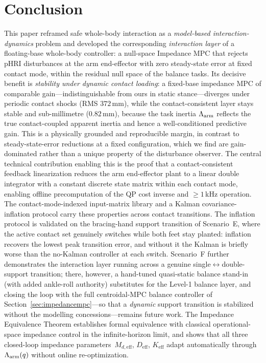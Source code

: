 \section{Conclusion}\label{sec:conclusion}

This paper reframed safe whole-body interaction as a \emph{model-based
interaction-dynamics} problem and developed the corresponding
\emph{interaction layer} of a floating-base whole-body controller: a
null-space Impedance MPC that rejects pHRI disturbances at the arm
end-effector with zero steady-state error at fixed contact mode, within the
residual null space of the balance tasks.
Its decisive benefit is \emph{stability under dynamic contact loading}: a
fixed-base impedance MPC of comparable gain---indistinguishable from ours in
static stance---diverges under periodic contact shocks (RMS $372$\,mm), while
the contact-consistent layer stays stable and sub-millimetre ($0.82$\,mm),
because the task inertia $\Lambda_{\text{arm}}$ reflects the true contact-coupled apparent
inertia and hence a well-conditioned predictive gain. This is a physically
grounded and reproducible margin, in contrast to steady-state-error reductions
at a fixed configuration, which we find are gain-dominated rather than a unique
property of the disturbance observer.
The central technical contribution enabling this is the proof that a
contact-consistent feedback linearization reduces the arm end-effector plant to
a linear double integrator with a constant discrete state matrix within each
contact mode, enabling offline precomputation of the QP cost inverse and
${\geq}1$\,kHz operation.
The contact-mode-indexed input-matrix library and a Kalman
covariance-inflation protocol carry these properties across contact
transitions. The inflation protocol is validated on the bracing-hand support
transition of Scenario~E, where the active contact set genuinely switches while
both feet stay planted: inflation recovers the lowest peak transition error,
and without it the Kalman is briefly worse than the no-Kalman controller at each
switch. Scenario~F further demonstrates the interaction layer running across a
genuine single$\leftrightarrow$double-support transition; there, however, a
hand-tuned quasi-static balance stand-in (with added ankle-roll authority)
substitutes for the Level-1 balance layer, and closing the loop with the full
centroidal-MPC balance controller of Section~\ref{sec:impedancempc}---so that a
\emph{dynamic} support transition is stabilized without the modelling
concessions---remains future work.
The Impedance Equivalence Theorem establishes formal equivalence with
classical operational-space impedance control in the infinite-horizon limit,
and shows that all three closed-loop impedance parameters~$M_{d,\text{eff}}$,
$D_{\text{eff}}$, $K_{\text{eff}}$ adapt automatically through
$\Lambda_{\text{arm}}(q)$ without online re-optimization.

